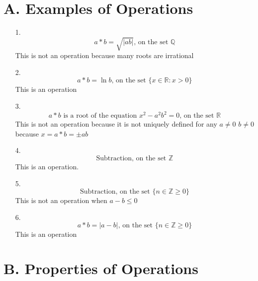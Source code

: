 \section*{A. Examples of Operations}

\begin{enumerate}

\item[1.]
\begin{equation}
a*b=\sqrt{|ab|} \text{, on the set } \mathbb{Q}
\end{equation}
This is not an operation because many roots are irrational

\item[2.]
\begin{equation}
a*b=\ln{b} \text{, on the set } \{x \in \mathbb{R} : x>0 \}
\end{equation}
This is an operation

\item[3.]
\begin{equation}
a*b \text{ is a root of the equation } x^2 - a^2b^2 = 0 \text{, on the set } \mathbb{R}
\end{equation}
This is not an operation because it is not uniquely defined for any $a\neq0$ $b\neq0$ because $x=a*b=\pm ab$

\item[4.]
\begin{equation}
\text{Subtraction, on the set } \mathbb{Z}
\end{equation}
This is an operation.

\item[5.]
\begin{equation}
\text{Subtraction, on the set } \{n \in \mathbb{Z} \geq 0 \}
\end{equation}
This is not an operation when $a-b \leq 0$

\item[6.]
\begin{equation}
a*b=|a-b| \text{, on the set } \{ n \in \mathbb{Z} \geq 0 \}
\end{equation}
This is an operation

\end{enumerate}

\section*{B. Properties of Operations}


